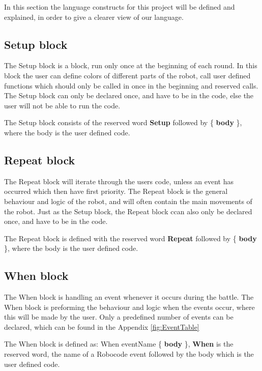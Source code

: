 In this section the language constructs for this project will be defined and explained, in order to give a clearer view of our language.

\subsection{Setup block}
The Setup block is a block, run only once at the beginning of each round. In this block the user can define colors of different parts of the robot, call user defined functions which should only be called in once in the beginning and reserved calls. The Setup block can only be declared once, and have to be in the code, else the user will not be able to run the code.

\begin{defi}
The Setup block consists of the reserved word \textbf{Setup} followed by \{ \textbf{body} \}, where the body is the user defined code. 
\end{defi}

\subsection{Repeat block}
The Repeat block will iterate through the users code, unless an event has occurred which then have first priority. The Repeat block is the general behaviour and logic of the robot, and will often contain the main movements of the robot. Just as the Setup block, the Repeat block ccan also only be declared once, and have to be in the code.

\begin{defi}
The Repeat block is defined with the reserved word \textbf{Repeat} followed by \{ \textbf{body} \}, where the body is the user defined code.
\end{defi}

\subsection{When block}
The When block is handling an event whenever it occurs during the battle. The When block is preforming the behaviour and logic when the events occur, where this will be made by the user. Only a predefined number of events can be declared, which can be found in the Appendix \ref{fig:EventTable}

\begin{defi}
The When block is defined as: When eventName \{ \textbf{body} \}, \textbf{When} is the reserved word, the name of a Robocode event followed by the body which is the user defined code.
\end{defi}


